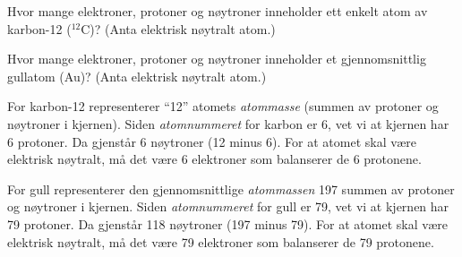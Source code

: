 

Hvor mange elektroner, protoner og nøytroner inneholder ett enkelt atom av karbon-12 ($^{12}$C)? (Anta elektrisk nøytralt atom.)

\vskip 10pt

Hvor mange elektroner, protoner og nøytroner inneholder et gjennomsnittlig gullatom (Au)? (Anta elektrisk nøytralt atom.)







For karbon-12 representerer ``12'' atomets {\it atommasse} (summen av protoner og nøytroner i kjernen). Siden {\it atomnummeret} for karbon er 6, vet vi at kjernen har 6 protoner. Da gjenstår 6 nøytroner (12 minus 6). For at atomet skal være elektrisk nøytralt, må det være 6 elektroner som balanserer de 6 protonene.

\vskip 10pt

For gull representerer den gjennomsnittlige {\it atommassen} 197 summen av protoner og nøytroner i kjernen. Siden {\it atomnummeret} for gull er 79, vet vi at kjernen har 79 protoner. Da gjenstår 118 nøytroner (197 minus 79). For at atomet skal være elektrisk nøytralt, må det være 79 elektroner som balanserer de 79 protonene.










